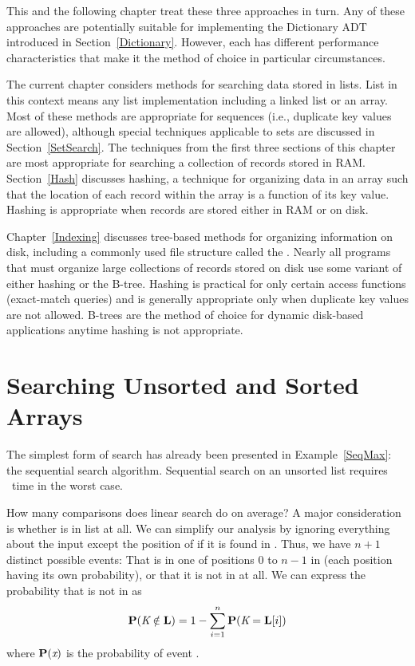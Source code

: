 This and the following chapter treat these three approaches in turn.
Any of these approaches are potentially suitable for implementing the
Dictionary ADT
introduced in Section~\ref{Dictionary}.
However, each has different performance characteristics that make it
the method of choice in particular circumstances.

The current chapter considers methods for searching data stored in
lists.
List in this context means any list implementation including a
linked list or an array.
Most of these methods are appropriate for sequences
(i.e., duplicate key values are allowed), although special techniques
applicable to sets are discussed in
Section~\ref{SetSearch}.
The techniques from the first three sections of this chapter are most
appropriate for searching a collection of records stored in RAM.
Section~\ref{Hash} discusses hashing, a technique for
organizing data in an array such that the location of each record
within the array is a function of its key value.
Hashing is appropriate when records are stored either in RAM or on
disk.

Chapter~\ref{Indexing} discusses tree-based methods for organizing
information on disk, including a commonly used file structure called
the \Btree.
Nearly all programs that must organize large collections of records
stored on disk use some variant of either hashing or the B-tree.
Hashing is practical for only certain access functions
(exact-match queries) 
and is generally appropriate only when duplicate key values are not
allowed.
B-trees are the method of choice for dynamic disk-based
applications anytime hashing is not appropriate.

\section{Searching Unsorted and Sorted Arrays}
\label{OrderedSearch}

The simplest form of search has already been presented in
Example~\ref{SeqMax}: the sequential search algorithm.
Sequential search on an unsorted list
requires \Thetan\ time in the worst case.

How many comparisons does linear search do on average?
A major consideration is whether  is in list  at
all.
We can simplify our analysis by ignoring everything about the input
except the position of  if it is found in .
Thus, we have \(n+1\) distinct possible events:
That  is in one of positions 0 to \(n-1\) in 
(each position having its own probability), or that it is not in
 at all.
We can express the probability that  is not in  as
\[\mathbf{P}({\textit{K}} \notin {\textbf{L}}) =
1 - \sum_{i=1}^n \mathbf{P}({\textit{K}} = {\textbf{L}}[i])\]
\noindent where \(\mathbf{P}({\textit{x}})\) is the probability of event
.

